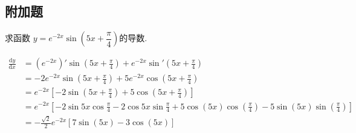 \begin{questions}
\begin{center}
		\section*{附加题}
	\end{center}
	\question 求函数 $y = e^{-2x}\sin\left(5x+\dfrac{\pi}{4}\right)$的导数.
	\begin{solution}
		\begin{align*}
			\frac{\mathrm{d}y}{\mathrm{d}x} & =  (e^{-2x})'\sin\left(5x + \frac{\pi}{4}\right) + e^{-2x}\sin'\left(5x +
			\frac{\pi}{4}\right)                                                                                        \\
			                                & = -2e^{-2x}\sin\left(5x+\frac{\pi}{4}\right) +
			5e^{-2x}\cos\left(5x+\frac{\pi}{4}\right)                                                                   \\
			                                & = e^{-2x}\left[-2\sin\left(5x + \frac{\pi}{4}\right) + 5\cos\left(5x +
			\frac{\pi}{4}\right)\right]                                                                                 \\
			                                & = e^{-2x}\left[-2\sin5x\cos\frac{\pi}{4} - 2\cos5x\sin\frac{\pi}{4} +
			5\cos(5x)\cos(\frac{\pi}{4}) - 5\sin(5x)\sin(\frac{\pi}{4})\right]                                          \\
			                                & = -\frac{\sqrt{2}}{2}e^{-2x}[7\sin(5x) - 3\cos(5x)]
		\end{align*}
	\end{solution}


\end{questions}

